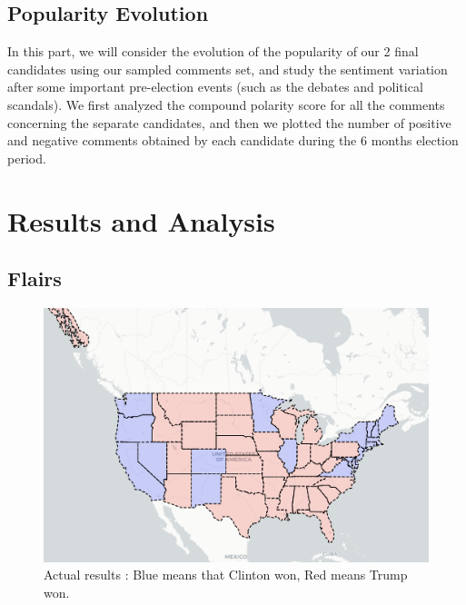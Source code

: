 \documentclass[11pt]{article}
\begin{document}
\subsection{Popularity Evolution}
In this part, we will consider the evolution of the popularity of our 2 final candidates using our sampled comments set, and study the sentiment variation after some important pre-election events (such as the debates and political scandals). We first analyzed the compound polarity score for all the comments concerning the separate candidates, and then we plotted the number of positive and negative comments obtained by each candidate during the 6 months election period.

\section{Results and Analysis}

\subsection{Flairs}
\begin{figure}[!h]
\centering\includegraphics[scale=0.15]{Images/real_results.png}
\caption{Actual results : Blue means that Clinton won, Red means Trump won.}
\label{US_result}
\end{figure}
\end{document}
